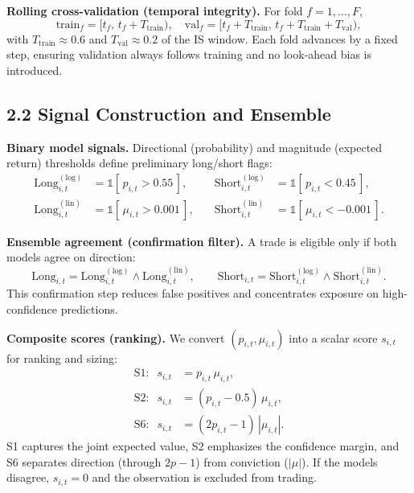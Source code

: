 \documentclass[11pt,a4paper]{article}
\begin{document}
    \medskip
    \textbf{Rolling cross-validation (temporal integrity).}
    For fold $f=1,\dots,F$,
    \[
        \text{train}_f=[t_f,\, t_f+T_{\text{train}}),
        \quad
        \text{val}_f=[t_f+T_{\text{train}},\, t_f+T_{\text{train}}+T_{\text{val}}),
    \]
    with $T_{\text{train}}\approx 0.6$ and $T_{\text{val}}\approx 0.2$ of the IS window. Each fold advances by a fixed step, ensuring validation always follows training and no look-ahead bias is introduced.

    \subsection*{2.2 Signal Construction and Ensemble}

    \textbf{Binary model signals.}
    Directional (probability) and magnitude (expected return) thresholds define preliminary long/short flags:
    \[
        \begin{aligned}
            \text{Long}^{(\mathrm{log})}_{i,t} &= \mathbb{1}[\,p_{i,t} > 0.55\,],
            &\quad \text{Short}^{(\mathrm{log})}_{i,t} &= \mathbb{1}[\,p_{i,t} < 0.45\,],\\
            \text{Long}^{(\mathrm{lin})}_{i,t} &= \mathbb{1}[\,\mu_{i,t} > 0.001\,],
            &\quad \text{Short}^{(\mathrm{lin})}_{i,t} &= \mathbb{1}[\,\mu_{i,t} < -0.001\,].
        \end{aligned}
    \]

    \textbf{Ensemble agreement (confirmation filter).}
    A trade is eligible only if both models agree on direction:
    \[
        \text{Long}_{i,t}=\text{Long}^{(\mathrm{log})}_{i,t}\land \text{Long}^{(\mathrm{lin})}_{i,t},\qquad
        \text{Short}_{i,t}=\text{Short}^{(\mathrm{log})}_{i,t}\land \text{Short}^{(\mathrm{lin})}_{i,t}.
    \]
    This confirmation step reduces false positives and concentrates exposure on high-confidence predictions.

    \medskip
    \textbf{Composite scores (ranking).}
    We convert $(p_{i,t},\mu_{i,t})$ into a scalar score $s_{i,t}$ for ranking and sizing:
    \[
        \boxed{
            \begin{aligned}
                \mathrm{S1:}\;\; s_{i,t} &= p_{i,t}\,\mu_{i,t},\\
                \mathrm{S2:}\;\; s_{i,t} &= (p_{i,t}-0.5)\,\mu_{i,t},\\
                \mathrm{S6:}\;\; s_{i,t} &= (2p_{i,t}-1)\,|\mu_{i,t}|.
            \end{aligned}}
    \]
    S1 captures the joint expected value, S2 emphasizes the confidence margin, and S6 separates direction (through $2p-1$) from conviction ($|\mu|$).
    If the models disagree, $s_{i,t}=0$ and the observation is excluded from trading.
\end{document}
